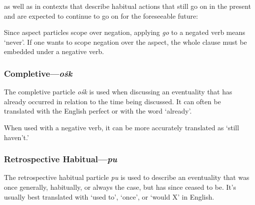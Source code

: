 \documentclass[a4paper,11pt,oneside,openany]{memoir}
\begin{document}

as well as in contexts that describe habitual actions that still go on in the present and are expected to continue to go on for the foreseeable future:


Since aspect particles scope over negation, applying \textit{go} to a negated verb means `never'. If one wants to scope negation over the aspect, the whole clause must be embedded under a negative verb.


\subsubsection{Completive---\textit{o\'sk}}

The completive particle \textit{o\'sk} is used when discussing an eventuality that has already occurred in relation to the time being discussed. It can often be translated with the English perfect or with the word `already'.


When used with a negative verb, it can be more accurately translated as `still haven't.'


\subsubsection{Retrospective Habitual---\textit{pu}}

The retrospective habitual particle \textit{pu} is used to describe an eventuality that was once generally, habitually, or always the case, but has since ceased to be. It's usually best translated with `used to', `once', or `would X' in English.
\end{document}
